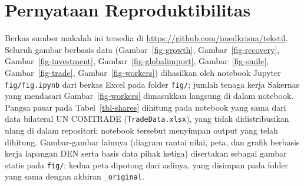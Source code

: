 \documentclass[
  manuscript=article,
  layout=publish,
  year=2026,
  volume=1,
]{den}
\begin{document}
\section*{Pernyataan
Reproduktibilitas}\label{pernyataan-reproduktibilitas}

Berkas sumber makalah ini tersedia di
\url{https://github.com/imedkrisna/tekstil}. Seluruh gambar berbasis
data (Gambar~\ref{fig-growth}, Gambar~\ref{fig-recovery},
Gambar~\ref{fig-investment}, Gambar~\ref{fig-globalimport},
Gambar~\ref{fig-smile}, Gambar~\ref{fig-trade},
Gambar~\ref{fig-workers}) dihasilkan oleh notebook Jupyter
\texttt{fig/fig.ipynb} dari berkas Excel pada folder \texttt{fig/};
jumlah tenaga kerja Sakernas yang mendasari Gambar~\ref{fig-workers}
dimasukkan langsung di dalam notebook. Pangsa pasar pada
Tabel~\ref{tbl-shares} dihitung pada notebook yang sama dari data
bilateral UN COMTRADE (\texttt{TradeData.xlsx}), yang tidak
didistribusikan ulang di dalam repositori; notebook tersebut menyimpan
output yang telah dihitung. Gambar-gambar lainnya (diagram rantai nilai,
peta, dan grafik berbasis kerja lapangan DEN serta basis data pihak
ketiga) disertakan sebagai gambar statis pada \texttt{fig/}; kedua peta
dipotong dari aslinya, yang disimpan pada folder yang sama dengan
akhiran \texttt{\_original}.
\end{document}
